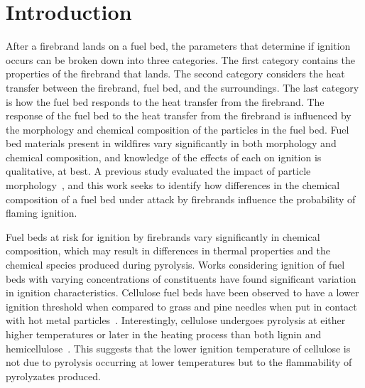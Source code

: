 \section{Introduction}\addvspace{10pt}
\label{sec:introduction3}
    
    After a firebrand lands on a fuel bed, the parameters that determine if ignition occurs can be broken down into three categories. The first category contains the properties of the firebrand that lands. The second category considers the heat transfer between the firebrand, fuel bed, and the surroundings. The last category is how the fuel bed responds to the heat transfer from the firebrand. The response of the fuel bed to the heat transfer from the firebrand is influenced by the morphology and chemical composition of the particles in the fuel bed. Fuel bed materials present in wildfires vary significantly in both morphology and chemical composition, and knowledge of the effects of each on ignition is qualitative, at best. A previous study evaluated the impact of particle morphology~\cite{Bean2021}, and this work seeks to identify how differences in the chemical composition of a fuel bed under attack by firebrands influence the probability of flaming ignition. 
    
    Fuel beds at risk for ignition by firebrands vary significantly in chemical composition, which may result in differences in thermal properties and the chemical species produced during pyrolysis. Works considering ignition of fuel beds with varying concentrations of constituents have found significant variation in ignition characteristics. Cellulose fuel beds have been observed to have a lower ignition threshold when compared to grass and pine needles when put in contact with hot metal particles~\cite{Urban2018}. Interestingly, cellulose undergoes pyrolysis at either higher temperatures or later in the heating process than both lignin and hemicellulose~\cite{Yang2007a, Shotorban2018}. This suggests that the lower ignition temperature of cellulose is not due to pyrolysis occurring at lower temperatures but to the flammability of pyrolyzates produced. 
    
